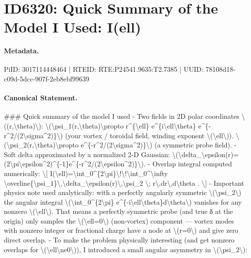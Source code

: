 \section*{ID6320: Quick Summary of the Model I Used: I(ell)}
\paragraph{Metadata.}
PiID: 3017114448464 | RTEID: RTE:P24541.9635:T2.7385 | UUID: 78108d18-c09d-5dcc-907f-2eb8ebf99639

\paragraph{Canonical Statement.}
\#\#\# Quick summary of the model I used - Two fields in 2D polar coordinates \textbackslash{}((r,\textbackslash{}theta)\textbackslash{}): \textbackslash{}(\textbackslash{}psi\_1(r,\textbackslash{}theta)\textbackslash{}propto r\textasciicircum{}\{\textbackslash{}ell\} e\textasciicircum{}\{i\textbackslash{}ell\textbackslash{}theta\} e\textasciicircum{}\{-r\textasciicircum{}2/(2\textbackslash{}sigma\textasciicircum{}2)\}\textbackslash{}) (your vortex / toroidal field, winding exponent \textbackslash{}(\textbackslash{}ell\textbackslash{})). \textbackslash{}(\textbackslash{}psi\_2(r,\textbackslash{}theta)\textbackslash{}propto e\textasciicircum{}\{-r\textasciicircum{}2/(2\textbackslash{}sigma\textasciicircum{}2)\}\textbackslash{}) (a symmetric probe field). - Soft delta approximated by a normalized 2-D Gaussian: \textbackslash{}(\textbackslash{}delta\_\textbackslash{}epsilon(r)=(2\textbackslash{}pi\textbackslash{}epsilon\textasciicircum{}2)\textasciicircum{}\{-1\}e\textasciicircum{}\{-r\textasciicircum{}2/(2\textbackslash{}epsilon\textasciicircum{}2)\}\textbackslash{}). - Overlap integral computed numerically: \textbackslash{}[ I(\textbackslash{}ell)=\textbackslash{}int\_0\textasciicircum{}\{2\textbackslash{}pi\}\textbackslash{}!\textbackslash{}!\textbackslash{}int\_0\textasciicircum{}\textbackslash{}infty \textbackslash{}overline\{\textbackslash{}psi\_1\}\textbackslash{},\textbackslash{}delta\_\textbackslash{}epsilon(r)\textbackslash{},\textbackslash{}psi\_2 \textbackslash{}; r\textbackslash{},dr\textbackslash{},d\textbackslash{}theta . \textbackslash{}] - Important physics note used analytically: with a perfectly angularly symmetric \textbackslash{}(\textbackslash{}psi\_2\textbackslash{}) the angular integral \textbackslash{}(\textbackslash{}int\_0\textasciicircum{}\{2\textbackslash{}pi\} e\textasciicircum{}\{-i\textbackslash{}ell\textbackslash{}theta\}d\textbackslash{}theta\textbackslash{}) vanishes for any nonzero \textbackslash{}(\textbackslash{}ell\textbackslash{}). That means a perfectly symmetric probe (and true δ at the origin) only samples the \textbackslash{}(\textbackslash{}ell=0\textbackslash{}) (non-vortex) component — vortex modes with nonzero integer or fractional charge have a node at \textbackslash{}(r=0\textbackslash{}) and give zero direct overlap. - To make the problem physically interesting (and get nonzero overlaps for \textbackslash{}(\textbackslash{}ell\textbackslash{}ne0\textbackslash{})), I introduced a small angular asymmetry in \textbackslash{}(\textbackslash{}psi\_2\textbackslash{}): 